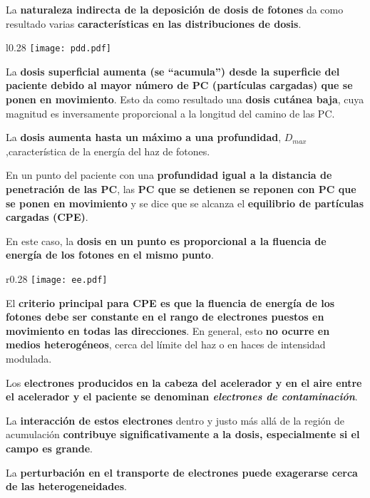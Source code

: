 \documentclass[aspectratio=169,xcolor=dvipsnames,t]{beamer}
\begin{document}
\begin{frame}

    La \textbf{naturaleza indirecta de la deposición de dosis de fotones} da como resultado varias \textbf{características en las distribuciones de dosis}.

    \begin{wrapfigure}{l}{0.28\textwidth}
        \centering
        \texttt{[image: pdd.pdf]}
    \end{wrapfigure}

    La \textbf{dosis superficial aumenta (se “acumula”) desde la superficie del paciente debido al mayor número de PC (partículas cargadas) que se ponen en movimiento}. Esto da como resultado una \textbf{dosis cutánea baja}, cuya magnitud es inversamente proporcional a la longitud del camino de las PC.

    La \textbf{dosis aumenta hasta un máximo a una profundidad}, $D_{max}$,característica de la energía del haz de fotones. 

    En un punto del paciente con una \textbf{profundidad igual a la distancia de penetración de las PC}, las \textbf{PC que se detienen se reponen con PC que se ponen en movimiento} y se dice que se alcanza el \textbf{equilibrio de partículas cargadas (CPE)}.

    En este caso, la \textbf{dosis en un punto es proporcional a la fluencia de energía de los fotones en el mismo punto}. 

\end{frame}

\begin{frame}

    \vspace{0.3cm}

    \begin{wrapfigure}{r}{0.28\textwidth}
        \centering
        \texttt{[image: ee.pdf]}
    \end{wrapfigure}

    El \textbf{criterio principal para CPE es que la fluencia de energía de los fotones debe ser constante en el rango de electrones puestos en movimiento en todas las direcciones}. En general, esto \textbf{no ocurre en medios heterogéneos}, cerca del límite del haz o en haces de intensidad modulada. 

    Los \textbf{electrones producidos en la cabeza del acelerador y en el aire entre el acelerador y el paciente se denominan \textit{electrones de contaminación}}.
    
    La \textbf{interacción de estos electrones} dentro y justo más allá de la región de acumulación \textbf{contribuye significativamente a la dosis, especialmente si el campo es grande}.
    
    La \textbf{perturbación en el transporte de electrones puede exagerarse cerca de las heterogeneidades}.

\end{frame}
\end{document}
